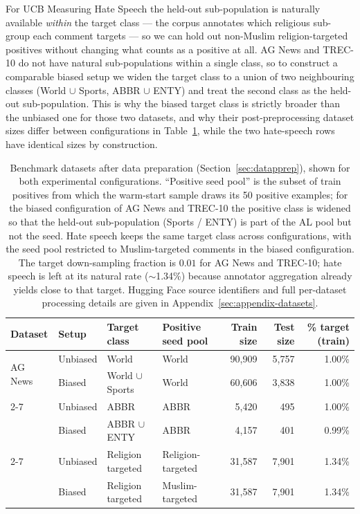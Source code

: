 \documentclass[11pt]{article}
\begin{document}
For UCB Measuring Hate Speech the held-out sub-population is naturally available \emph{within} the target class --- the corpus annotates which religious sub-group each comment targets --- so we can hold out non-Muslim religion-targeted positives without changing what counts as a positive at all. AG News and TREC-10 do not have natural sub-populations within a single class, so to construct a comparable biased setup we widen the target class to a union of two neighbouring classes (World $\cup$ Sports, ABBR $\cup$ ENTY) and treat the second class as the held-out sub-population. This is why the biased target class is strictly broader than the unbiased one for those two datasets, and why their post-preprocessing dataset sizes differ between configurations in Table~\ref{tab:datasets}, while the two hate-speech rows have identical sizes by construction.

\begin{table}[t]
\centering
\small
\begin{tabular}{@{}llllrrr@{}}
\toprule
Dataset & Setup & Target class & Positive seed pool & Train size & Test size & \% target (train) \\
\midrule
\multirow{2}{*}{AG News}         & Unbiased & World                  & World             & 90{,}909 & 5{,}757 & 1.00\% \\
                                  & Biased   & World $\cup$ Sports    & World             & 60{,}606 & 3{,}838 & 1.00\% \\
\cmidrule(lr){2-7}
\multirow{2}{*}{TREC-10}         & Unbiased & ABBR                   & ABBR              & 5{,}420  & 495     & 1.00\% \\
                                  & Biased   & ABBR $\cup$ ENTY       & ABBR              & 4{,}157  & 401     & 0.99\% \\
\cmidrule(lr){2-7}
\multirow{2}{*}{UCB Hate Speech} & Unbiased & Religion targeted      & Religion-targeted & 31{,}587 & 7{,}901 & 1.34\% \\
                                  & Biased   & Religion targeted      & Muslim-targeted   & 31{,}587 & 7{,}901 & 1.34\% \\
\bottomrule
\end{tabular}
\caption{Benchmark datasets after data preparation (Section~\ref{sec:datapprep}), shown for both experimental configurations. ``Positive seed pool'' is the subset of train positives from which the warm-start sample draws its 50 positive examples; for the biased configuration of AG News and TREC-10 the positive class is widened so that the held-out sub-population (Sports / ENTY) is part of the AL pool but not the seed. Hate speech keeps the same target class across configurations, with the seed pool restricted to Muslim-targeted comments in the biased configuration. The target down-sampling fraction is $0.01$ for AG News and TREC-10; hate speech is left at its natural rate ($\sim$1.34\%) because annotator aggregation already yields close to that target. Hugging Face source identifiers and full per-dataset processing details are given in Appendix~\ref{sec:appendix-datasets}.}
\label{tab:datasets}
\end{table}
\end{document}
